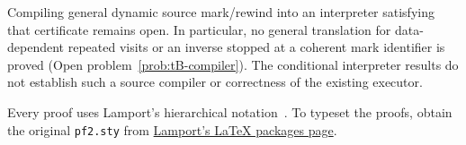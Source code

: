 Compiling general dynamic source mark/rewind into an interpreter satisfying that certificate remains open. In particular, no general translation for data-dependent repeated visits or an inverse stopped at a coherent mark identifier is proved (Open problem~\ref{prob:tB-compiler}). The conditional interpreter results do not establish such a source compiler or correctness of the existing executor.

Every proof uses Lamport's hierarchical notation~\cite[Section~3, PDF pp.~9--11]{Lamport2012}.
To typeset the proofs, obtain the original \texttt{pf2.sty} from
\href{https://lamport.azurewebsites.net/latex/latex.html}{Lamport's LaTeX packages page}.
